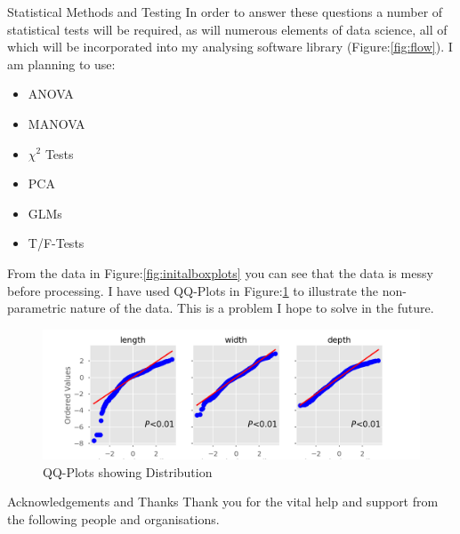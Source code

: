 \documentclass[final]{beamer}
\begin{document}
\begin{frame}{}
\begin{textblock}{28}
\begin{block}{Statistical Methods and Testing}
      In order to answer these questions a number of statistical tests will be required,
      as will numerous elements of data science, all of which will be incorporated into
      my analysing software library (Figure:\ref{fig:flow}). I am planning to use:

      \begin{multicols}{2}

        \begin{itemize}
        \item ANOVA
        \item MANOVA
        \item $\chi^2$ Tests
        \end{itemize}

        \columnbreak

        \begin{itemize}
        \item PCA
        \item GLMs
        \item T/F-Tests
        \end{itemize}

      \end{multicols}

      From the data in Figure:\ref{fig:initalboxplots} you can see that the data is
      messy before processing. I have used QQ-Plots in Figure:\ref{fig:qq} to illustrate
      the non-parametric nature of the data. This is a problem I hope to solve in the future.
        \begin{figure}[htb]
          \centering
          \includegraphics[width=22cm]{qqplots.png}
          \caption{\label{fig:qq} QQ-Plots showing Distribution}
        \end{figure}

    \end{block}


    \begin{block}{Acknowledgements and Thanks}
      Thank you for the vital help and support from the following people and organisations.


\end{block}
\end{textblock}
\end{frame}
\end{document}
